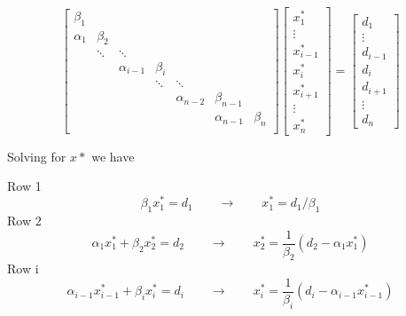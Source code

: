 \documentclass[landscape]{article}
\begin{document}
\[
\left[\begin{array}{ccccccccc}
\beta_{1}  &               &              &              &              &             &           \\
\alpha_{1} & \beta_{2}     &              &              &              &             &           \\
           & \ddots        & \ddots       &              &              &             &           \\
           &               & \alpha_{i-1} & \beta_{i}    &              &             &           \\
           &               &              & \ddots       & \ddots       &             &           \\
           &               &              &              & \alpha_{n-2} & \beta_{n-1} &           \\
           &               &              &              &              & \alpha_{n-1}& \beta_{n} \\
\end{array} \right]
\left[ \begin{array}{c}
x^*_{1} \\ \vdots \\ x^*_{i-1} \\ x^*_{i} \\ x^*_{i+1} \\ \vdots \\ x^*_{n}
\end{array} \right]
=
\left[ \begin{array}{c}
d_{1} \\ \vdots \\ d_{i-1} \\ d_{i} \\ d_{i+1} \\ \vdots \\ d_{n}
\end{array} \right]
\]

Solving for $x*$ we have

Row 1
\begin{equation}
  \beta_1 x_1^* = d_1
  \qquad \rightarrow \qquad
  x_1^* = d_1/\beta_1
\end{equation}
Row 2
\begin{equation}
  \alpha_1 x_1^* + \beta_2 x_2^* = d_2
  \qquad \rightarrow \qquad
  x_2^* = \frac{1}{\beta_2} (d_2 - \alpha_1 x_1^*)
\end{equation}
Row i
\begin{equation}
  \alpha_{i-1} x_{i-1}^* + \beta_{i} x_{i}^* = d_{i}
  \qquad \rightarrow \qquad
  x_{i}^* = \frac{1}{\beta_{i}} (d_{i} - \alpha_{i-1} x_{i-1}^*)
\end{equation}
\end{document}
